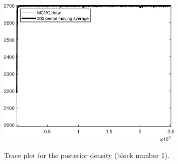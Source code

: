 \begin{figure}[H]
\centering
  \includegraphics[width=0.8\textwidth]{BRS_growth_ext_fd_v1/graphs/TracePlot_Posterior_blck_1}\\
    \caption{Trace plot for the posterior density (block number 1).}
\end{figure}
